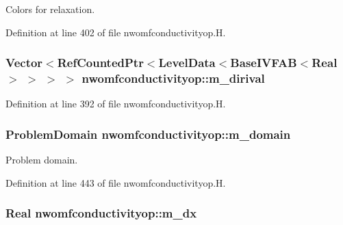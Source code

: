 Colors for relaxation. 



Definition at line 402 of file nwomfconductivityop.\+H.

\subsubsection[{\texorpdfstring{m\+\_\+dirival}{m_dirival}}]{\setlength{\rightskip}{0pt plus 5cm}Vector$<$Ref\+Counted\+Ptr$<$Level\+Data$<$Base\+I\+V\+F\+AB$<$Real$>$ $>$ $>$ $>$ nwomfconductivityop\+::m\+\_\+dirival\hspace{0.3cm}{\ttfamily [protected]}}\hypertarget{classnwomfconductivityop_a31ec9f563da2ff8d96b8bfb7ed666af6}{}\label{classnwomfconductivityop_a31ec9f563da2ff8d96b8bfb7ed666af6}


Definition at line 392 of file nwomfconductivityop.\+H.

\subsubsection[{\texorpdfstring{m\+\_\+domain}{m_domain}}]{\setlength{\rightskip}{0pt plus 5cm}Problem\+Domain nwomfconductivityop\+::m\+\_\+domain\hspace{0.3cm}{\ttfamily [protected]}}\hypertarget{classnwomfconductivityop_a50ab53648a2fe88ecac4ba4eb701f232}{}\label{classnwomfconductivityop_a50ab53648a2fe88ecac4ba4eb701f232}


Problem domain. 



Definition at line 443 of file nwomfconductivityop.\+H.

\subsubsection[{\texorpdfstring{m\+\_\+dx}{m_dx}}]{\setlength{\rightskip}{0pt plus 5cm}Real nwomfconductivityop\+::m\+\_\+dx\hspace{0.3cm}{\ttfamily [protected]}}\hypertarget{classnwomfconductivityop_af68ef11597075bdc23e41a769d19f8ec}{}\label{classnwomfconductivityop_af68ef11597075bdc23e41a769d19f8ec}


